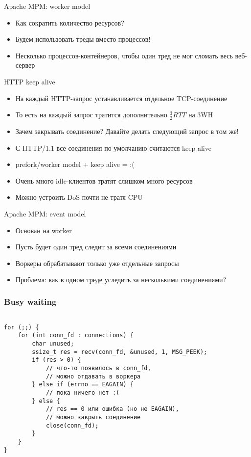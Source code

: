 \documentclass[10pt,pdf,hyperref={unicode}]{beamer}
\begin{document}
\begin{frame}{Apache MPM: worker model}
\begin{itemize}
    \item Как сократить количество ресурсов?
    \item Будем использовать треды вместо процессов!
    \item Несколько процессов-контейнеров, чтобы один тред не мог сломать весь веб-сервер
\end{itemize}
\end{frame}

\begin{frame}{HTTP keep alive}
\begin{itemize}
    \item На каждый HTTP-запрос устанавливается отдельное TCP-соединение
    \item То есть на каждый запрос тратится дополнительно $\frac{3}{2} RTT$ на 3WH
    \item Зачем закрывать соединение? Давайте делать следующий запрос в том же!
    \item С HTTP/1.1 все соединения по-умолчанию считаются keep alive
    \item prefork/worker model + keep alive = :(
    \item Очень много idle-клиентов тратят слишком много ресурсов
    \item Можно устроить DoS почти не тратя CPU
\end{itemize}
\end{frame}

\begin{frame}{Apache MPM: event model}
\begin{itemize}
    \item Основан на worker
    \item Пусть будет один тред следит за всеми соединениями
    \item Воркеры обрабатывают только уже отдельные запросы
    \item Проблема: как в одном треде уследить за несколькими соединениями?
\end{itemize}
\end{frame}

\begin{frame}[fragile]
\frametitle{Busy waiting}
\begin{center}
\begin{minipage}{0.95\textwidth}
\begin{verbatim}

for (;;) {
    for (int conn_fd : connections) {
        char unused;
        ssize_t res = recv(conn_fd, &unused, 1, MSG_PEEK);
        if (res > 0) {
            // что-то появилось в conn_fd,
            // можно отдавать в воркера
        } else if (errno == EAGAIN) {
            // пока ничего нет :(
        } else {
            // res == 0 или ошибка (но не EAGAIN),
            // можно закрыть соединение
            close(conn_fd);
        }
    }
}

\end{verbatim}
\end{minipage}
\end{center}
\end{frame}
\end{document}

